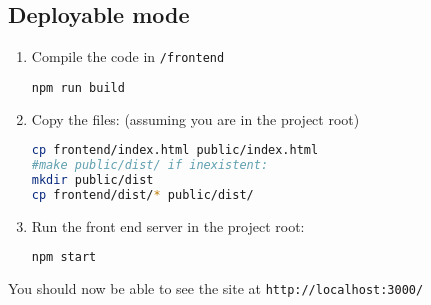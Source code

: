 \documentclass[a4paper]{article}
\begin{document}
\subsection{Deployable mode}
\begin{enumerate}
\item Compile the code in \texttt{/frontend}
\begin{lstlisting}[language=bash]
npm run build
\end{lstlisting}
\item Copy the files: (assuming you are in the project root)
\begin{lstlisting}[language=bash]
cp frontend/index.html public/index.html
#make public/dist/ if inexistent:
mkdir public/dist
cp frontend/dist/* public/dist/
\end{lstlisting} 
\item Run the front end server in the project root:
\begin{lstlisting}[language=bash]
npm start
\end{lstlisting}
\end{enumerate}
You should now be able to see the site at \texttt{http://localhost:3000/}
\end{document}
